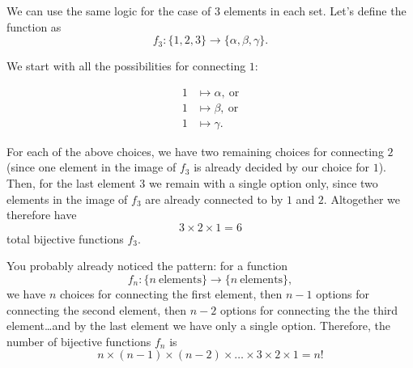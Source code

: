 \begin{enumerate}
\begin{center}
		\hspace{2cm}
		\end{center}

	We can use the same logic for the case of $3$ elements in each set. Let's define the function as
	\[
		f_{3}:\{1,2,3\}\to\{\alpha,\beta,\gamma\}.
	\]

	We start with all the possibilities for connecting $1$:

	\begin{align*}
		1&\mapsto\alpha,\ \text{or}\\
		1&\mapsto\beta,\ \text{or}\\
		1&\mapsto\gamma.
	\end{align*}

	For each of the above choices, we have two remaining choices for connecting $2$ (since one element in the image of $f_{3}$ is already decided by our choice for $1$). Then, for the last element $3$ we remain with a single option only, since two elements in the image of $f_{3}$ are already connected to by $1$ and $2$. Altogether we therefore have
	\[
		3\times2\times1 = 6
	\]
	total bijective functions $f_{3}$.

	You probably already noticed the pattern: for a function
	\[
		f_{n}:\{n\ \text{elements}\} \to \{n\ \text{elements}\},
	\]
	we have $n$ choices for connecting the first element, then $n-1$ options for connecting the second element, then $n-2$ options for connecting the the third element\ldots and by the last element we have only a single option. Therefore, the number of bijective functions $f_{n}$ is
	\[
		n\times(n-1)\times(n-2)\times\dots\times3\times2\times1 = n!
	\]


\end{enumerate}
